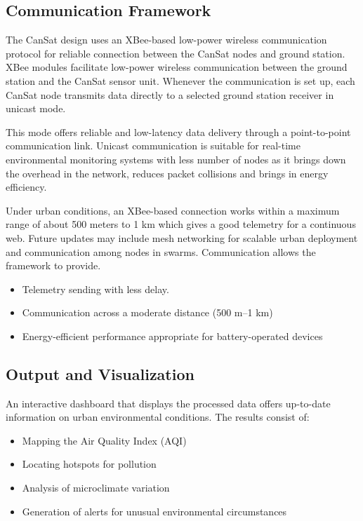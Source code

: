 \documentclass[conference]{IEEEtran}
\begin{document}
\subsection{Communication Framework}

The CanSat design uses an XBee-based low-power wireless communication protocol for reliable connection between the CanSat nodes and ground station.
XBee modules facilitate low-power wireless communication between the ground station and the CanSat sensor unit. Whenever the communication is set up, each CanSat node transmits data directly to a selected ground station receiver in unicast mode.

This mode offers reliable and low-latency data delivery through a point-to-point communication link. Unicast communication is suitable for real-time environmental monitoring systems with less number of nodes as it brings down the overhead in the network, reduces packet collisions and brings in energy efficiency.

Under urban conditions, an XBee-based connection works within a maximum range of about 500 meters to 1 km which gives a good telemetry for a continuous web.
Future updates may include mesh networking for scalable urban deployment and communication among nodes in swarms. Communication allows the framework to provide.
\begin{itemize}
    \item Telemetry sending with less delay.
    \item Communication across a moderate distance (500 m--1 km)
    \item Energy-efficient performance appropriate for battery-operated devices
\end{itemize}

\subsection{Output and Visualization}

An interactive dashboard that displays the processed data offers up-to-date information on urban environmental conditions. The results consist of:
\begin{itemize}
    \item Mapping the Air Quality Index (AQI)
    \item Locating hotspots for pollution
    \item Analysis of microclimate variation
    \item Generation of alerts for unusual environmental circumstances
\end{itemize}
\end{document}
